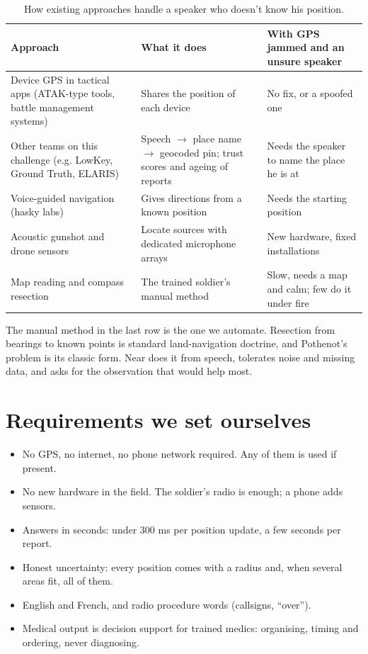 \begin{table}[htbp]\centering\small
\caption{How existing approaches handle a speaker who doesn't know his position.}\label{tab:gap}
\begin{tabularx}{\linewidth}{>{\raggedright}p{3.6cm}X>{\raggedright\arraybackslash}p{3.8cm}}
\toprule
Approach & What it does & With GPS jammed and an unsure speaker\\
\midrule
Device GPS in tactical apps (ATAK-type tools, battle management systems) & Shares the position of each device & No fix, or a spoofed one\\
Other teams on this challenge (e.g. LowKey, Ground Truth, ELARIS) & Speech $\rightarrow$ place name $\rightarrow$ geocoded pin; trust scores and ageing of reports & Needs the speaker to name the place he is at\\
Voice-guided navigation (hasky labs) & Gives directions from a known position & Needs the starting position\\
Acoustic gunshot and drone sensors & Locate sources with dedicated microphone arrays & New hardware, fixed installations\\
Map reading and compass resection & The trained soldier's manual method & Slow, needs a map and calm; few do it under fire\\
\bottomrule
\end{tabularx}
\end{table}

The manual method in the last row is the one we automate. Resection from bearings to known points
is standard land-navigation doctrine, and Pothenot's problem is its classic form. Near does it
from speech, tolerates noise and missing data, and asks for the observation that would help most.

\section{Requirements we set ourselves}

\begin{itemize}
  \item No GPS, no internet, no phone network required. Any of them is used if present.
  \item No new hardware in the field. The soldier's radio is enough; a phone adds sensors.
  \item Answers in seconds: under 300 ms per position update, a few seconds per report.
  \item Honest uncertainty: every position comes with a radius and, when several areas fit, all of them.
  \item English and French, and radio procedure words (callsigns, ``over'').
  \item Medical output is decision support for trained medics: organising, timing and ordering, never diagnosing.
\end{itemize}
